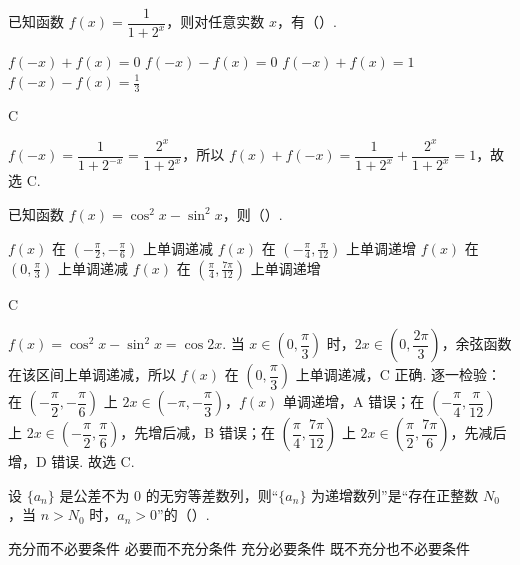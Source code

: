 \begin{problem}
已知函数 \(f(x)=\dfrac{1}{1+2^x}\)，则对任意实数 \(x\)，有（\quad）.

\choices
    {\(f(-x)+f(x)=0\)}
    {\(f(-x)-f(x)=0\)}
    {\(f(-x)+f(x)=1\)}
    {\(f(-x)-f(x)=\frac13\)}
\end{problem}

\begin{answer}
C
\end{answer}

\begin{solution}
\(f(-x)=\dfrac{1}{1+2^{-x}}=\dfrac{2^x}{1+2^x}\)，所以 \(f(x)+f(-x)=\dfrac{1}{1+2^x}+\dfrac{2^x}{1+2^x}=1\)，故选 C.
\end{solution}

\begin{problem}
已知函数 \(f(x)=\cos^2x-\sin^2x\)，则（\quad）.

\choices
    {\(f(x)\) 在 \(\left(-\frac{\pi}{2},-\frac{\pi}{6}\right)\) 上单调递减}
    {\(f(x)\) 在 \(\left(-\frac{\pi}{4},\frac{\pi}{12}\right)\) 上单调递增}
    {\(f(x)\) 在 \(\left(0,\frac{\pi}{3}\right)\) 上单调递减}
    {\(f(x)\) 在 \(\left(\frac{\pi}{4},\frac{7\pi}{12}\right)\) 上单调递增}
\end{problem}

\begin{answer}
C
\end{answer}

\begin{solution}
\(f(x)=\cos^2x-\sin^2x=\cos2x\). 当 \(x\in\left(0,\dfrac\pi3\right)\) 时，\(2x\in\left(0,\dfrac{2\pi}3\right)\)，余弦函数在该区间上单调递减，所以 \(f(x)\) 在 \(\left(0,\dfrac\pi3\right)\) 上单调递减，C 正确. 逐一检验：在 \(\left(-\dfrac\pi2,-\dfrac\pi6\right)\) 上 \(2x\in\left(-\pi,-\dfrac\pi3\right)\)，\(f(x)\) 单调递增，A 错误；在 \(\left(-\dfrac\pi4,\dfrac\pi{12}\right)\) 上 \(2x\in\left(-\dfrac\pi2,\dfrac\pi6\right)\)，先增后减，B 错误；在 \(\left(\dfrac\pi4,\dfrac{7\pi}{12}\right)\) 上 \(2x\in\left(\dfrac\pi2,\dfrac{7\pi}6\right)\)，先减后增，D 错误. 故选 C.
\end{solution}

\begin{problem}
设 \(\{a_n\}\) 是公差不为 0 的无穷等差数列，则“\(\{a_n\}\) 为递增数列”是“存在正整数 \(N_0\)，当 \(n>N_0\) 时，\(a_n>0\)”的（\quad）.

\choices
    {充分而不必要条件}
    {必要而不充分条件}
    {充分必要条件}
    {既不充分也不必要条件}
\end{problem}


